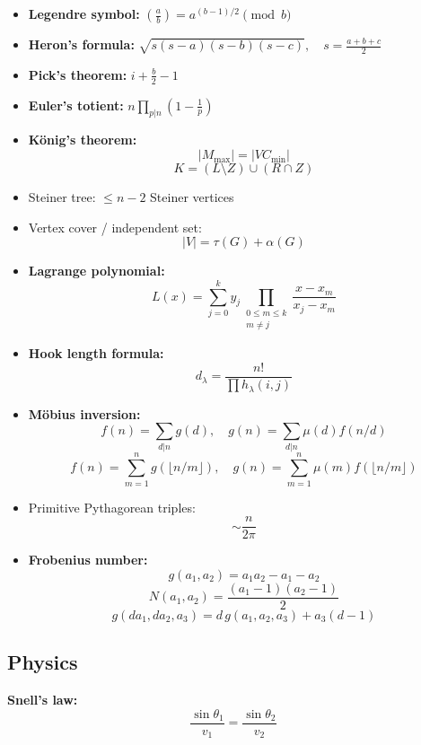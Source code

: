 
\begin{itemize}[leftmargin=*]
\item \textbf{Legendre symbol:} $\left(\frac{a}{b}\right) = a^{(b-1)/2} \pmod{b}$

\item \textbf{Heron's formula:} $\sqrt{s(s-a)(s-b)(s-c)}, \quad s=\frac{a+b+c}{2}$

\item \textbf{Pick's theorem:} $i + \frac{b}{2} - 1$

\item \textbf{Euler's totient:} $n\prod_{p|n}\left(1 - \frac{1}{p}\right)$

\item \textbf{König's theorem:}
\[
|M_{\max}| = |VC_{\min}|
\]
\[
K=(L\setminus Z)\cup(R\cap Z)
\]

\item Steiner tree: $\le n-2$ Steiner vertices

\item Vertex cover / independent set:
\[
|V| = \tau(G) + \alpha(G)
\]

\item \textbf{Lagrange polynomial:}
\[
L(x)=\sum_{j=0}^k y_j \prod_{\substack{0\le m \le k \\ m\ne j}} \frac{x-x_m}{x_j-x_m}
\]

\item \textbf{Hook length formula:}
\[
d_\lambda = \frac{n!}{\prod h_\lambda(i,j)}
\]

\item \textbf{Möbius inversion:}
\[
f(n)=\sum_{d|n} g(d), \quad g(n)=\sum_{d|n}\mu(d)f(n/d)
\]
\[
f(n)=\sum_{m=1}^n g(\lfloor n/m\rfloor), \quad g(n)=\sum_{m=1}^n \mu(m) f(\lfloor n/m\rfloor)
\]

\item Primitive Pythagorean triples:
\[
\sim \frac{n}{2\pi}
\]

\item \textbf{Frobenius number:}
\[
g(a_1,a_2)=a_1a_2-a_1-a_2
\]
\[
N(a_1,a_2)=\frac{(a_1-1)(a_2-1)}{2}
\]
\[
g(d a_1,d a_2,a_3)=d\,g(a_1,a_2,a_3)+a_3(d-1)
\]

\end{itemize}

\subsection{Physics}
\textbf{Snell's law:}
\[
\frac{\sin\theta_1}{v_1}=\frac{\sin\theta_2}{v_2}
\]

